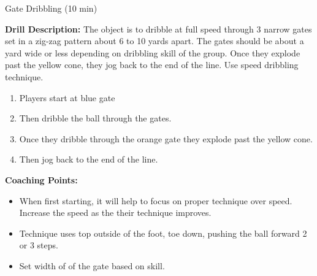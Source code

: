 \begin{oddBlock}{Gate Dribbling (10 min)}
\begin{minipage}[t]{\linewidth}
\begin{minipage}{.3\linewidth}
    \end{minipage}
    \hspace{0.05\linewidth}
    \begin{minipage}{.6\linewidth} %
        \textbf{Drill Description:}
        The object is to dribble at full speed through 3 narrow gates set in a zig-zag pattern about 6 to 10 yards apart.  The gates should be about a yard wide or less depending on dribbling skill of the group.  Once they explode past the yellow cone, they jog back to the end of the line.  Use speed dribbling technique.
        \begin{enumerate}
        \setlength{\itemsep}{0pt}
        \setlength{\parskip}{0pt}
        \setlength{\parsep}{0pt}
        \item Players start at blue gate
        \item Then dribble the ball through the gates.
        \item Once they dribble through the orange gate they explode past the yellow cone.
        \item Then jog back to the end of the line.
        \end{enumerate}

        \textbf{Coaching Points:}
        \begin{itemize}
        \setlength{\itemsep}{0pt}
        \setlength{\parskip}{0pt}
        \setlength{\parsep}{0pt}
        \item When first starting, it will help to focus on proper technique over speed.  Increase the speed as the their technique improves.
        \item Technique uses top outside of the foot, toe down, pushing the ball forward 2 or 3 steps.
        \item Set width of of the gate based on skill.
        \end{itemize}

    \end{minipage}
\end{minipage}

\end{oddBlock}